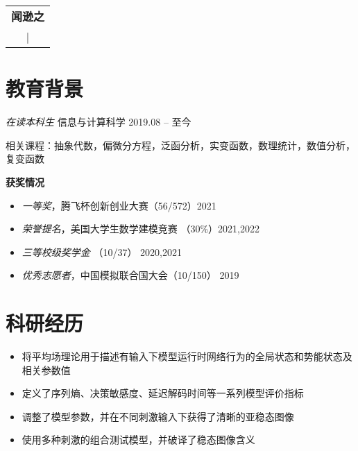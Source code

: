 \documentclass{resume}
\begin{document}
\begin{table}
  \centering
  \begin{tabu}{ c }
    \centering
    \textbf{\huge{闻逊之}}   \\
     |  \\
  \end{tabu}
\end{table}

\vspace{2pt}
\section{教育背景}
\textit{在读本科生} \quad 信息与计算科学 \hfill{2019.08 -- 至今}

相关课程：抽象代数，偏微分方程，泛函分析，实变函数，数理统计，数值分析，复变函数

\textbf{获奖情况}
\begin{itemize}
  \item \textit{一等奖}，腾飞杯创新创业大赛（56/572）\hfill 2021
  \item \textit{荣誉提名}，美国大学生数学建模竞赛 （30\%）\hfill 2021,2022
  \item \textit{三等校级奖学金} （10/37） \hfill 2020,2021
  \item \textit{优秀志愿者}，中国模拟联合国大会（10/150） \hfill 2019
\end{itemize}

\section{科研经历}

\begin{itemize}
  \item 将平均场理论用于描述有输入下模型运行时网络行为的全局状态和势能状态及相关参数值
  \item 定义了序列熵、决策敏感度、延迟解码时间等一系列模型评价指标
  \item 调整了模型参数，并在不同刺激输入下获得了清晰的亚稳态图像
  \item 使用多种刺激的组合测试模型，并破译了稳态图像含义
\end{itemize}
\end{document}
